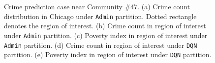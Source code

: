 \begin{figure}[t!]
\centering
{}
\caption{Crime prediction case near Community \#47. (a) Crime count distribution in Chicago under \texttt{Admin} partition. Dotted rectangle denotes the region of interest. (b) Crime count in region of interest under \texttt{Admin} partition. (c) Poverty index in region of interest under \texttt{Admin} partition. (d) Crime count in region of interest under \texttt{DQN} partition. (e) Poverty index in region of interest under \texttt{DQN} partition.}
\label{fig:crime-case}
\end{figure}

